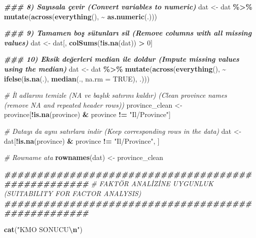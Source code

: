 \documentclass[
]{article}
\newenvironment{Shaded}{\begin{snugshade}}{\end{snugshade}}
\newcommand{\AttributeTok}[1]{\textcolor[rgb]{0.13,0.29,0.53}{#1}}
\newcommand{\CommentTok}[1]{\textcolor[rgb]{0.56,0.35,0.01}{\textit{#1}}}
\newcommand{\ConstantTok}[1]{\textcolor[rgb]{0.56,0.35,0.01}{#1}}
\newcommand{\DecValTok}[1]{\textcolor[rgb]{0.00,0.00,0.81}{#1}}
\newcommand{\DocumentationTok}[1]{\textcolor[rgb]{0.56,0.35,0.01}{\textbf{\textit{#1}}}}
\newcommand{\FunctionTok}[1]{\textcolor[rgb]{0.13,0.29,0.53}{\textbf{#1}}}
\newcommand{\NormalTok}[1]{#1}
\newcommand{\OtherTok}[1]{\textcolor[rgb]{0.56,0.35,0.01}{#1}}
\newcommand{\SpecialCharTok}[1]{\textcolor[rgb]{0.81,0.36,0.00}{\textbf{#1}}}
\newcommand{\StringTok}[1]{\textcolor[rgb]{0.31,0.60,0.02}{#1}}
\begin{document}
\begin{Shaded}
\begin{Highlighting}[]
\DocumentationTok{\#\#\# 8) Sayısala çevir (Convert variables to numeric)}
\NormalTok{dat }\OtherTok{\textless{}{-}}\NormalTok{ dat }\SpecialCharTok{\%\textgreater{}\%} \FunctionTok{mutate}\NormalTok{(}\FunctionTok{across}\NormalTok{(}\FunctionTok{everything}\NormalTok{(), }\SpecialCharTok{\textasciitilde{}} \FunctionTok{as.numeric}\NormalTok{(.)))}

\DocumentationTok{\#\#\# 9) Tamamen boş sütunları sil (Remove columns with all missing values)}
\NormalTok{dat }\OtherTok{\textless{}{-}}\NormalTok{ dat[, }\FunctionTok{colSums}\NormalTok{(}\SpecialCharTok{!}\FunctionTok{is.na}\NormalTok{(dat)) }\SpecialCharTok{\textgreater{}} \DecValTok{0}\NormalTok{]}

\DocumentationTok{\#\#\# 10) Eksik değerleri median ile doldur (Impute missing values using the median)}
\NormalTok{dat }\OtherTok{\textless{}{-}}\NormalTok{ dat }\SpecialCharTok{\%\textgreater{}\%}
  \FunctionTok{mutate}\NormalTok{(}\FunctionTok{across}\NormalTok{(}\FunctionTok{everything}\NormalTok{(),}
                \SpecialCharTok{\textasciitilde{}} \FunctionTok{ifelse}\NormalTok{(}\FunctionTok{is.na}\NormalTok{(.), }\FunctionTok{median}\NormalTok{(., }\AttributeTok{na.rm =} \ConstantTok{TRUE}\NormalTok{), .)))}


\CommentTok{\# İl adlarını temizle (NA ve başlık satırını kaldır) (Clean province names (remove NA and repeated header rows))}
\NormalTok{province\_clean }\OtherTok{\textless{}{-}}\NormalTok{ province[}\SpecialCharTok{!}\FunctionTok{is.na}\NormalTok{(province) }\SpecialCharTok{\&}\NormalTok{ province }\SpecialCharTok{!=} \StringTok{"Il/Province"}\NormalTok{]}

\CommentTok{\# Datayı da aynı satırlara indir (Keep corresponding rows in the data)}
\NormalTok{dat }\OtherTok{\textless{}{-}}\NormalTok{ dat[}\SpecialCharTok{!}\FunctionTok{is.na}\NormalTok{(province) }\SpecialCharTok{\&}\NormalTok{ province }\SpecialCharTok{!=} \StringTok{"Il/Province"}\NormalTok{, ]}

\CommentTok{\# Rowname ata}
\FunctionTok{rownames}\NormalTok{(dat) }\OtherTok{\textless{}{-}}\NormalTok{ province\_clean}


\DocumentationTok{\#\#\#\#\#\#\#\#\#\#\#\#\#\#\#\#\#\#\#\#\#\#\#\#\#\#\#\#\#\#\#\#\#\#\#\#\#\#\#\#\#\#\#\#\#\#\#\#\#\#\#}
\CommentTok{\# FAKTÖR ANALİZİNE UYGUNLUK (SUITABILITY FOR FACTOR ANALYSIS)}
\DocumentationTok{\#\#\#\#\#\#\#\#\#\#\#\#\#\#\#\#\#\#\#\#\#\#\#\#\#\#\#\#\#\#\#\#\#\#\#\#\#\#\#\#\#\#\#\#\#\#\#\#\#\#\#}

\FunctionTok{cat}\NormalTok{(}\StringTok{"KMO SONUCU}\SpecialCharTok{\textbackslash{}n}\StringTok{"}\NormalTok{)}
\end{Highlighting}
\end{Shaded}
\end{document}
